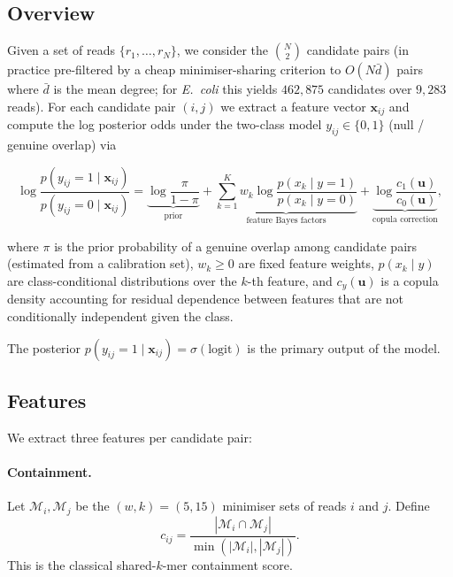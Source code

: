 \documentclass[11pt]{article}
\begin{document}
\subsection{Overview}

Given a set of reads $\{r_1, \ldots, r_N\}$, we consider the
$\binom{N}{2}$ candidate pairs (in practice pre-filtered by a cheap
minimiser-sharing criterion to $O(N \bar d)$ pairs where $\bar d$ is the
mean degree; for \textit{E.\ coli} this yields $462{,}875$ candidates over
$9{,}283$ reads). For each candidate pair $(i, j)$ we extract a feature
vector $\mathbf{x}_{ij}$ and compute the log posterior odds under the
two-class model $y_{ij} \in \{0, 1\}$ (null / genuine overlap) via

\begin{equation}
    \log \frac{p(y_{ij} = 1 \mid \mathbf{x}_{ij})}{p(y_{ij} = 0 \mid \mathbf{x}_{ij})}
    = \underbrace{\log\frac{\pi}{1-\pi}}_{\text{prior}} +
      \underbrace{\sum_{k=1}^{K} w_k \log\frac{p(x_k \mid y=1)}{p(x_k \mid y=0)}}_{\text{feature Bayes factors}} +
      \underbrace{\log\frac{c_1(\mathbf{u})}{c_0(\mathbf{u})}}_{\text{copula correction}},
    \label{eq:logit}
\end{equation}

where $\pi$ is the prior probability of a genuine overlap among candidate
pairs (estimated from a calibration set), $w_k \ge 0$ are fixed feature
weights, $p(x_k \mid y)$ are class-conditional distributions over the $k$-th
feature, and $c_y(\mathbf{u})$ is a copula density accounting for residual
dependence between features that are not conditionally independent given
the class.

The posterior $p(y_{ij} = 1 \mid \mathbf{x}_{ij}) = \sigma(\text{logit})$ is
the primary output of the model.

\subsection{Features}

We extract three features per candidate pair:

\paragraph{Containment.}
Let $\mathcal{M}_i, \mathcal{M}_j$ be the $(w, k) = (5, 15)$ minimiser sets
of reads $i$ and $j$. Define
\begin{equation}
    c_{ij} = \frac{|\mathcal{M}_i \cap \mathcal{M}_j|}{\min(|\mathcal{M}_i|, |\mathcal{M}_j|)}.
\end{equation}
This is the classical shared-$k$-mer containment score.
\end{document}
